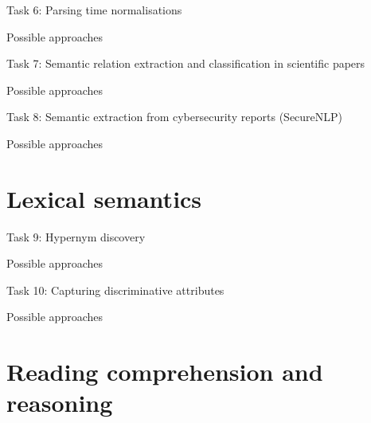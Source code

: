 \documentclass[10pt, compress]{beamer}
\begin{document}
\begin{frame}{Task 6: Parsing time normalisations}


\end{frame}

\begin{frame}{Possible approaches}


\end{frame}

\begin{frame}{Task 7: Semantic relation extraction and classification in scientific papers}


\end{frame}

\begin{frame}{Possible approaches}


\end{frame}

\begin{frame}{Task 8: Semantic extraction from cybersecurity reports (SecureNLP)}


\end{frame}

\begin{frame}{Possible approaches}


\end{frame}

\section{Lexical semantics}

\begin{frame}{Task 9: Hypernym discovery}


\end{frame}

\begin{frame}{Possible approaches}


\end{frame}

\begin{frame}{Task 10: Capturing discriminative attributes}


\end{frame}

\begin{frame}{Possible approaches}


\end{frame}

\section{Reading comprehension and reasoning}
\end{document}
